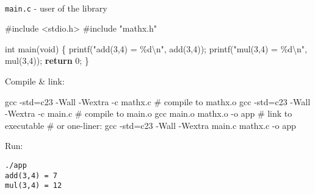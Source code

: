 \documentclass[
  letterpaper,
  DIV=11,
  numbers=noendperiod]{scrreprt}
\makeatletter
\let\oldparagraph\paragraph
\renewcommand{\paragraph}{
    \@ifstar
      \xxxParagraphStar
      \xxxParagraphNoStar
  }
\newcommand{\xxxParagraphStar}[1]{\oldparagraph*{#1}\mbox{}}
\newcommand{\xxxParagraphNoStar}[1]{\oldparagraph{#1}\mbox{}}
\newenvironment{Shaded}{\begin{snugshade}}{\end{snugshade}}
\newcommand{\AttributeTok}[1]{\textcolor[rgb]{0.40,0.45,0.13}{#1}}
\newcommand{\CommentTok}[1]{\textcolor[rgb]{0.37,0.37,0.37}{#1}}
\newcommand{\ControlFlowTok}[1]{\textcolor[rgb]{0.00,0.23,0.31}{\textbf{#1}}}
\newcommand{\DataTypeTok}[1]{\textcolor[rgb]{0.68,0.00,0.00}{#1}}
\newcommand{\DecValTok}[1]{\textcolor[rgb]{0.68,0.00,0.00}{#1}}
\newcommand{\FunctionTok}[1]{\textcolor[rgb]{0.28,0.35,0.67}{#1}}
\newcommand{\ImportTok}[1]{\textcolor[rgb]{0.00,0.46,0.62}{#1}}
\newcommand{\NormalTok}[1]{\textcolor[rgb]{0.00,0.23,0.31}{#1}}
\newcommand{\OperatorTok}[1]{\textcolor[rgb]{0.37,0.37,0.37}{#1}}
\newcommand{\PreprocessorTok}[1]{\textcolor[rgb]{0.68,0.00,0.00}{#1}}
\newcommand{\SpecialCharTok}[1]{\textcolor[rgb]{0.37,0.37,0.37}{#1}}
\newcommand{\StringTok}[1]{\textcolor[rgb]{0.13,0.47,0.30}{#1}}
\makeatother
\begin{document}
\paragraph{\texorpdfstring{\texttt{main.c} - user of the
library}{main.c - user of the library}}\label{main.c---user-of-the-library}

\begin{Shaded}
\begin{Highlighting}[]
\PreprocessorTok{\#include }\ImportTok{\textless{}stdio.h\textgreater{}}
\PreprocessorTok{\#include }\ImportTok{"mathx.h"}

\DataTypeTok{int}\NormalTok{ main}\OperatorTok{(}\DataTypeTok{void}\OperatorTok{)} \OperatorTok{\{}
\NormalTok{    printf}\OperatorTok{(}\StringTok{"add(3,4) = }\SpecialCharTok{\%d\textbackslash{}n}\StringTok{"}\OperatorTok{,}\NormalTok{ add}\OperatorTok{(}\DecValTok{3}\OperatorTok{,}\DecValTok{4}\OperatorTok{));}
\NormalTok{    printf}\OperatorTok{(}\StringTok{"mul(3,4) = }\SpecialCharTok{\%d\textbackslash{}n}\StringTok{"}\OperatorTok{,}\NormalTok{ mul}\OperatorTok{(}\DecValTok{3}\OperatorTok{,}\DecValTok{4}\OperatorTok{));}
    \ControlFlowTok{return} \DecValTok{0}\OperatorTok{;}
\OperatorTok{\}}
\end{Highlighting}
\end{Shaded}

Compile \& link:

\begin{Shaded}
\begin{Highlighting}[]
\FunctionTok{gcc} \AttributeTok{{-}std}\OperatorTok{=}\NormalTok{c23 }\AttributeTok{{-}Wall} \AttributeTok{{-}Wextra} \AttributeTok{{-}c}\NormalTok{ mathx.c    }\CommentTok{\# compile to mathx.o}
\FunctionTok{gcc} \AttributeTok{{-}std}\OperatorTok{=}\NormalTok{c23 }\AttributeTok{{-}Wall} \AttributeTok{{-}Wextra} \AttributeTok{{-}c}\NormalTok{ main.c     }\CommentTok{\# compile to main.o}
\FunctionTok{gcc}\NormalTok{ main.o mathx.o }\AttributeTok{{-}o}\NormalTok{ app                }\CommentTok{\# link to executable}
\CommentTok{\# or one{-}liner:}
\FunctionTok{gcc} \AttributeTok{{-}std}\OperatorTok{=}\NormalTok{c23 }\AttributeTok{{-}Wall} \AttributeTok{{-}Wextra}\NormalTok{ main.c mathx.c }\AttributeTok{{-}o}\NormalTok{ app}
\end{Highlighting}
\end{Shaded}

Run:

\begin{verbatim}
./app
add(3,4) = 7
mul(3,4) = 12
\end{verbatim}
\end{document}
